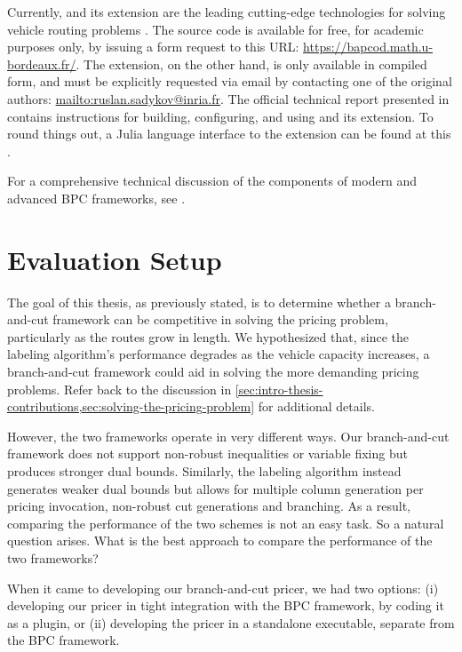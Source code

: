 \medskip

Currently, \bapcod{} and its \vrpsolver{} extension are the leading cutting-edge technologies
for solving vehicle routing problems \parencite{pessoa2020generic}.
The \bapcod{} source code is available for free, for academic purposes only,
by issuing a form request to this URL: \url{https://bapcod.math.u-bordeaux.fr/}.
The \vrpsolver{} extension, on the other hand, is only available in compiled form,
and must be explicitly requested via email by contacting one of the
original authors: \url{mailto:ruslan.sadykov@inria.fr}.
The official technical report presented in \textcite{sadykov2021} contains instructions
for building, configuring, and using \bapcod{} and its \vrpsolver{} extension.
To round things out, a Julia language interface to the \vrpsolver{} extension
can be found at this .

For a comprehensive technical discussion of the components of
modern and advanced BPC frameworks, see \textcite{sadykov2019modern}.

\section{Evaluation Setup}
\label{sec:results-evaluation-setup}

The goal of this thesis, as previously stated, is to determine whether a branch-and-cut framework can be competitive in solving the pricing problem, particularly as the routes grow in length.
We hypothesized that, since the labeling algorithm's performance degrades as the vehicle capacity increases, a branch-and-cut framework could aid in solving the more demanding pricing problems.
Refer back to the discussion in \cref{sec:intro-thesis-contributions,sec:solving-the-pricing-problem} for additional details.

However, the two frameworks operate in very different ways.
Our branch-and-cut framework does not support non-robust inequalities or variable fixing
but produces stronger dual bounds.
Similarly, the labeling algorithm instead generates weaker dual bounds
but allows for multiple column generation per pricing invocation,
non-robust cut generations and branching.
As a result, comparing the performance of the two schemes is not an easy task.
So a natural question arises.
What is the best approach to compare the performance of the two frameworks?

\medskip

When it came to developing our branch-and-cut pricer, we had two options:
(i) developing our pricer in tight integration with the BPC framework, by coding it as a \bapcod{} plugin,
or (ii) developing the pricer in a standalone executable, separate from the BPC framework.

